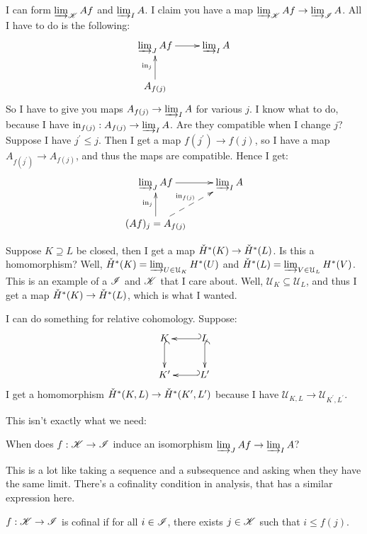 I can form $\varinjlim_{\mathscr K}Af$ and $\varinjlim_{I}A$. I claim you have a map $\varinjlim_{\mathscr K}Af\to\varinjlim_{\mathscr I}A$. All I have to do is the following:
\begin{equation*}
\xymatrix{
	\varinjlim_{J}Af\ar[r] & \varinjlim_{I}A\\
	A_{f(j)}\ar[u]^{\mathrm{in}_j}
}
\end{equation*}
So I have to give you maps $A_{f(j)}\to\varinjlim_{I}A$ for various $j$. I know what to do, because I have $\mathrm{in}_{f(j)}:A_{f(j)}\to\varinjlim_{I}A$. Are they compatible when I change $j$? Suppose I have $j^\prime\leq j$. Then I get a map $f(j^\prime)\to f(j)$, so I have a map $A_{f(j^\prime)}\to A_{f(j)}$, and thus the maps are compatible. Hence I get:
\begin{equation*}
\xymatrix{
	\varinjlim_{J}Af\ar[r] & \varinjlim_{I}A\\
	(Af)_j=A_{f(j)}\ar@{-->}[ur]^{\mathrm{in}_{f(j)}}\ar[u]^{\mathrm{in}_j}
}
\end{equation*}
\begin{example}
Suppose $K\supseteq L$ be closed, then I get a map $\check{H}^\ast(K)\to\check{H}^\ast(L)$. Is this a homomorphism? Well, $\check{H}^\ast(K)=\varinjlim_{U\in\mathcal{U}_K}H^\ast(U)$ and $\check{H}^\ast(L)=\varinjlim_{V\in\mathcal{U}_L}H^\ast(V)$. This is an example of a $\mathscr I$ and $\mathscr K$ that I care about. Well, $\mathcal{U}_K\subseteq\mathcal{U}_L$, and thus I get a map $\check{H}^\ast(K)\to\check{H}^\ast(L)$, which is what I wanted.

I can do something for relative cohomology. Suppose:
\begin{equation*}
\xymatrix{K\ar@{^(->}[d] & L\ar@{^(->}[d]\ar@{_(->}[l] \\ K^\prime & L^\prime\ar@{_(->}[l]}
\end{equation*}
I get a homomorphism $\check{H}^\ast(K,L)\to \check{H}^\ast(K^\prime,L^\prime)$ because I have $\mathcal{U}_{K,L}\to\mathcal{U}_{K^\prime,L^\prime}$.
\end{example}
This isn't exactly what we need:
\begin{question}
When does $f:\mathscr K\to\mathscr I$ induce an isomorphism $\varinjlim_{J}Af\to\varinjlim_{I}A$?
\end{question}
This is a lot like taking a sequence and a subsequence and asking when they have the same limit. There's a cofinality condition in analysis, that has a similar expression here.
\begin{definition}
$f:\mathscr K\to\mathscr I$ is cofinal if for all $i\in\mathscr I$, there exists $j\in\mathscr K$ such that $i\leq f(j)$.
\end{definition}
